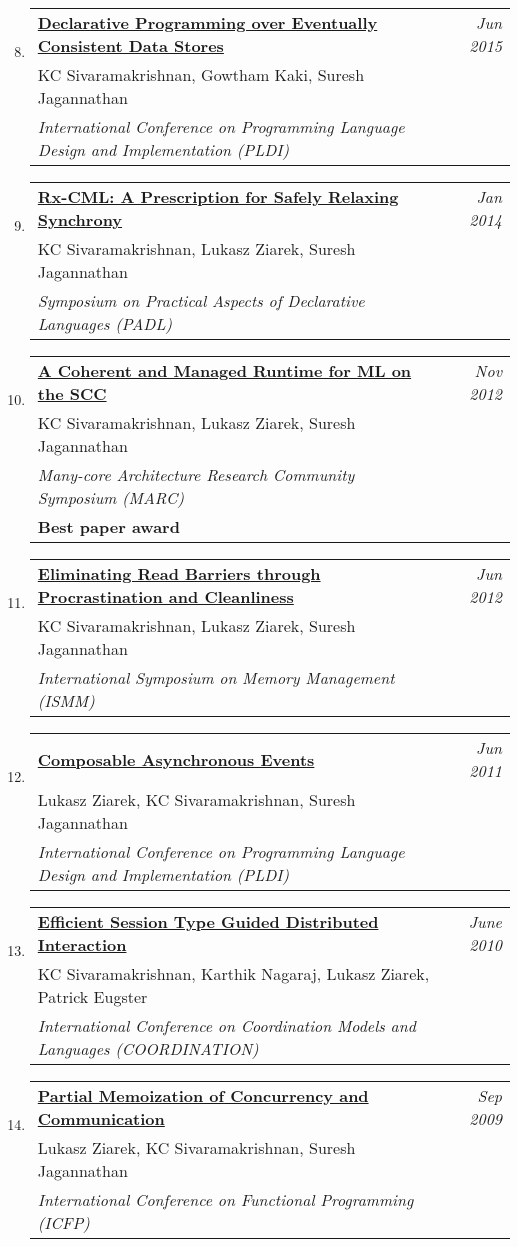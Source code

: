 \documentclass[10pt]{article}
\makeatletter
\newcommand{\lbar}[1]{{\color{#1}\ding{118}}\hspace*{2pt}}
\newenvironment{benumerate}[2]{
    \let\oldItem\item
    \def\item{\addtocounter{enumi}{-2}\oldItem}
    \begin{enumerate}[#2]
    \setcounter{enumi}{#1}
    \addtocounter{enumi}{1}}
  {\end{enumerate}}
\newenvironment{publication}[5]
{ \item
  \begin{tabular*}{7.5in}{p{6.3in}@{\extracolsep{\fill}}r}
    \href{#1}{\textbf{#2}} & \textit{#3}\\ #4 &\\ \textit{#5}&\\
  \end{tabular*}
} {}
\newenvironment{publicationNote}[6]
{ \item
  \begin{tabular*}{7.5in}{p{6.3in}@{\extracolsep{\fill}}r}
    \href{#1}{\textbf{#2}} & \textit{#3}\\ #4 &\\ \textit{#5}\\ \textbf{#6} \\
  \end{tabular*}
} {}
\newenvironment{region}[3]{%
  \vspace*{0.5ex}
  {\scalebox{1.4}{\textbf{#1}}}
  \begin{benumerate}{#3}{\color{RoyalBlue}#2}}
  {\end{benumerate}\vspace{1ex}}
\makeatother
\begin{document}
\begin{region} {\lbar{purple}Conference Publications}{{C}1}{7}
	\begin{publication} {http://kcsrk.info/papers/quelea_pldi15.pdf}
		{Declarative Programming over Eventually Consistent Data Stores}
		{Jun 2015} {KC Sivaramakrishnan, Gowtham Kaki, Suresh Jagannathan}
		{International Conference on Programming Language Design and Implementation (PLDI)}
	\end{publication}

	\begin{publication}{http://kcsrk.info/papers/rxcml_padl14.pdf}
		{Rx-CML: A Prescription for Safely Relaxing Synchrony}
		{Jan 2014}{KC Sivaramakrishnan, Lukasz Ziarek, Suresh Jagannathan}
		{Symposium on Practical Aspects of Declarative Languages (PADL)}
	\end{publication}

	\begin{publicationNote}{http://kcsrk.info/papers/mmscc_marc12.pdf}
		{A Coherent and Managed Runtime for ML on the SCC}
		{Nov 2012}{KC Sivaramakrishnan, Lukasz Ziarek, Suresh Jagannathan}
		{Many-core Architecture Research Community Symposium (MARC)}
		{Best paper award}
	\end{publicationNote}

	\begin{publication}{http://kcsrk.info/papers/mmgc_ismm12.pdf}
		{Eliminating Read Barriers through Procrastination and Cleanliness}
		{Jun 2012}{KC Sivaramakrishnan, Lukasz Ziarek, Suresh Jagannathan}
		{International Symposium on Memory Management (ISMM)}
	\end{publication}

	\begin{publication}{http://kcsrk.info/papers/acml_pldi11.pdf}
		{Composable Asynchronous Events}
		{Jun 2011}{Lukasz Ziarek, KC Sivaramakrishnan, Suresh Jagannathan}
		{International Conference on Programming Language Design and Implementation (PLDI)}
	\end{publication}

	\begin{publication}{http://kcsrk.info/papers/sting_coordination10.pdf}
		{Efficient Session Type Guided Distributed Interaction}
		{June 2010}{KC Sivaramakrishnan, Karthik Nagaraj, Lukasz Ziarek, Patrick Eugster}
		{International Conference on Coordination Models and Languages (COORDINATION)}
	\end{publication}

	\begin{publication}{http://kcsrk.info/papers/memo_icfp09.pdf}
		{Partial Memoization of Concurrency and Communication}
		{Sep 2009}{Lukasz Ziarek, KC Sivaramakrishnan, Suresh Jagannathan}
		{International Conference on Functional Programming (ICFP)}
	\end{publication}
\end{region}
\end{document}
